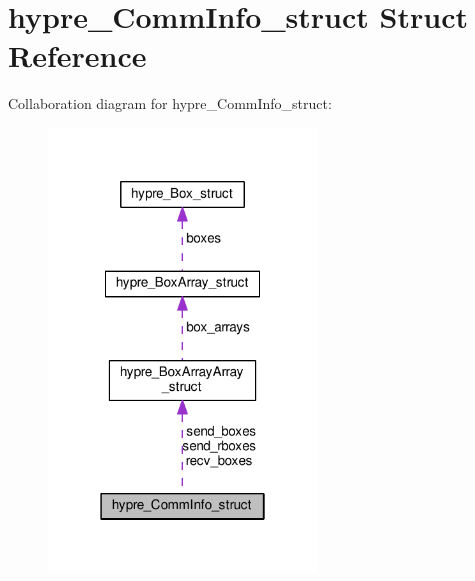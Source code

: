 \hypertarget{structhypre__CommInfo__struct}{}\section{hypre\+\_\+\+Comm\+Info\+\_\+struct Struct Reference}
\label{structhypre__CommInfo__struct}


Collaboration diagram for hypre\+\_\+\+Comm\+Info\+\_\+struct\+:
\nopagebreak
\begin{figure}[H]
\begin{center}
\leavevmode
\includegraphics[width=202pt]{structhypre__CommInfo__struct__coll__graph}
\end{center}
\end{figure}
